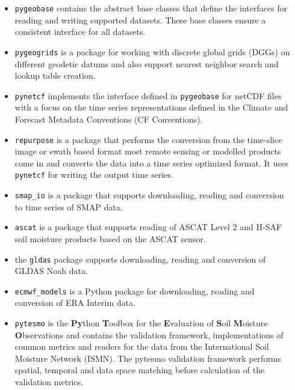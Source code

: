 \documentclass[20pt, a0paper, portrait]{tikzposter}
\newcommand{\code}[1]{\colorbox{light-gray}{\texttt{#1}}}
\begin{document}
\begin{columns}
{     \begin{itemize}
     \item \code{pygeobase} contains the abstract base classes that define the
       interfaces for reading and writing supported datasets. These base classes
       ensure a consistent interface for all datasets.
     \item \code{pygeogrids} is a package for working with discrete global grids
       (DGGs) on different geodetic datums and also support nearest neighbor
       search and lookup table creation.
     \item \code{pynetcf} implements the interface defined in \code{pygeobase}
       for netCDF files with a focus on the time series representations defined
       in the Climate and Forecast Metadata Conventions (CF Conventions).
     \item \code{repurpose} is a package that performs the conversion from the
       time-slice image or swath based format most remote sensing or modelled
       products come in and converts the data into a time series optimized
       format. It uses \code{pynetcf} for writing the output time series.
     \item \code{smap\_io} is a package that supports downloading, reading and
       conversion to time series of SMAP data.
     \item \code{ascat} is a package that supports reading of ASCAT Level 2 and
       H-SAF soil moisture products based on the ASCAT sensor.
     \item the \code{gldas} package supports downloading, reading and conversion
       of GLDAS Noah data.
     \item \code{ecmwf\_models} is a Python package for downloading, reading and
       conversion of ERA Interim data.
     \item \code{pytesmo} is the \textbf{Py}thon \textbf{T}oolbox for the
       \textbf{E}valuation of \textbf{S}oil \textbf{M}oisture
       \textbf{O}bservations and contains the validation framework,
       implementations of common metrics and readers for the data from the
       International Soil Moisture Network (ISMN). The pytesmo validation
       framework performs spatial, temporal and data space matching before
       calculation of the validation metrics.
     \end{itemize} 

  }

  \begin{subcolumns}



\end{subcolumns}
\end{columns}
\end{document}
